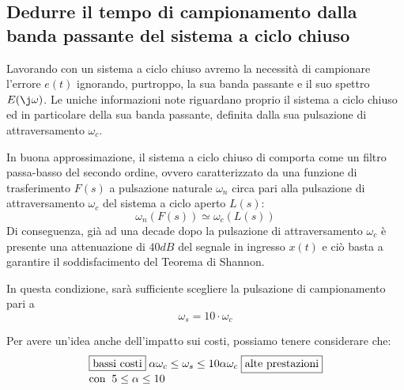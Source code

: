 \documentclass[a4paper]{report}
\begin{document}
\subsection{Dedurre il tempo di campionamento dalla banda passante del
  sistema a ciclo chiuso}
Lavorando con un sistema a ciclo chiuso avremo la necessit\`a di
campionare l'errore $e(t)$ ignorando, purtroppo, la sua banda passante
e il suo spettro $E(\j \omega)$. Le uniche informazioni note
riguardano proprio il sistema a ciclo chiuso ed in particolare della
sua banda passante, definita dalla sua pulsazione di attraversamento
$\omega_c$.

In buona approssimazione, il sistema a ciclo chiuso di comporta come
un filtro passa-basso del secondo ordine, ovvero caratterizzato da una
funzione di trasferimento $F(s)$ a pulsazione naturale $\omega_n$
circa pari alla pulsazione di attraversamento $\omega_c$ del sistema a
ciclo aperto $L(s)$:
\[
\omega_n(F(s)) \simeq \omega_c(L(s))
\]
Di conseguenza, gi\`a ad una decade dopo la pulsazione di
attraversamento $\omega_c$ \`e presente una attenuazione di $40dB$ del
segnale in ingresso $x(t)$ e ci\`o basta a garantire il
soddisfacimento del Teorema di Shannon.

In questa condizione, sar\`a sufficiente scegliere la pulsazione di
campionamento pari a
\begin{equation}
  \omega_s = 10 \cdot \omega_c
\end{equation}

Per avere un'idea anche dell'impatto sui costi, possiamo tenere
considerare che:
\begin{equation}\label{eq:omegaSomegaC}
  \begin{array}{l}
    \fbox{bassi costi}\; \alpha \omega_c \leq \omega_s \leq 10 \alpha
    \omega_c \;\fbox{alte prestazioni}\\
    \textrm{con}\;\;5 \leq \alpha \leq 10
  \end{array}
\end{equation}
\end{document}
